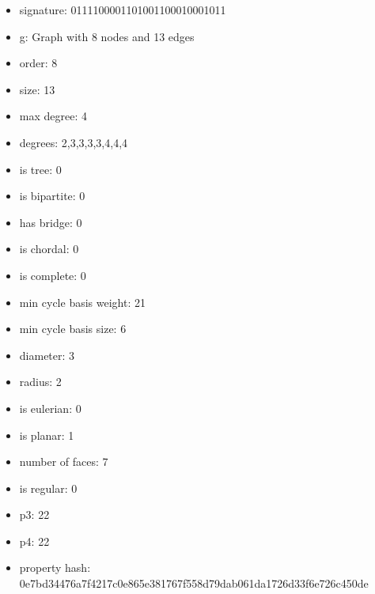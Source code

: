 \begin{itemize}
\item signature: 0111100001101001100010001011
\item g: Graph with 8 nodes and 13 edges
\item order: 8
\item size: 13
\item max degree: 4
\item degrees: 2,3,3,3,3,4,4,4
\item is tree: 0
\item is bipartite: 0
\item has bridge: 0
\item is chordal: 0
\item is complete: 0
\item min cycle basis weight: 21
\item min cycle basis size: 6
\item diameter: 3
\item radius: 2
\item is eulerian: 0
\item is planar: 1
\item number of faces: 7
\item is regular: 0
\item p3: 22
\item p4: 22
\item property hash: 0e7bd34476a7f4217c0e865e381767f558d79dab061da1726d33f6e726c450de
\end{itemize}
\newpage
\begin{figure}
\end{figure}
